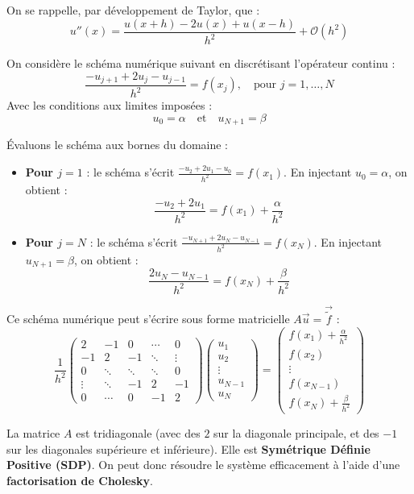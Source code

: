 On se rappelle, par développement de Taylor, que :
$$u''(x) = \frac{u(x+h) - 2u(x) + u(x-h)}{h^2} + \mathcal{O}(h^2)$$

On considère le schéma numérique suivant en discrétisant l'opérateur continu :
$$\frac{-u_{j+1} + 2u_j - u_{j-1}}{h^2} = f(x_j), \quad \text{pour } j=1, \dots, N$$
Avec les conditions aux limites imposées :
$$u_0 = \alpha \quad \text{et} \quad u_{N+1} = \beta$$

Évaluons le schéma aux bornes du domaine :
\begin{itemize}
    \item \textbf{Pour $j=1$} : le schéma s'écrit $\frac{-u_2 + 2u_1 - u_0}{h^2} = f(x_1)$. En injectant $u_0 = \alpha$, on obtient :
    $$\frac{-u_2 + 2u_1}{h^2} = f(x_1) + \frac{\alpha}{h^2}$$
    \item \textbf{Pour $j=N$} : le schéma s'écrit $\frac{-u_{N+1} + 2u_N - u_{N-1}}{h^2} = f(x_N)$. En injectant $u_{N+1} = \beta$, on obtient :
    $$\frac{2u_N - u_{N-1}}{h^2} = f(x_N) + \frac{\beta}{h^2}$$
\end{itemize}

Ce schéma numérique peut s'écrire sous forme matricielle $A\vec{u} = \vec{\tilde{f}}$ :
$$
\frac{1}{h^2}
\begin{pmatrix}
2 & -1 & 0 & \cdots & 0 \\
-1 & 2 & -1 & \ddots & \vdots \\
0 & \ddots & \ddots & \ddots & 0 \\
\vdots & \ddots & -1 & 2 & -1 \\
0 & \cdots & 0 & -1 & 2
\end{pmatrix}
\begin{pmatrix}
u_1 \\
u_2 \\
\vdots \\
u_{N-1} \\
u_N
\end{pmatrix}
=
\begin{pmatrix}
f(x_1) + \frac{\alpha}{h^2} \\
f(x_2) \\
\vdots \\
f(x_{N-1}) \\
f(x_N) + \frac{\beta}{h^2}
\end{pmatrix}
$$

\begin{remarque}
La matrice $A$ est tridiagonale (avec des $2$ sur la diagonale principale, et des $-1$ sur les diagonales supérieure et inférieure). Elle est \textbf{Symétrique Définie Positive (SDP)}. On peut donc résoudre le système efficacement à l'aide d'une \textbf{factorisation de Cholesky}.
\end{remarque}

